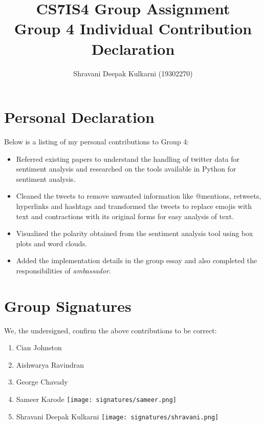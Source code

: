 \documentclass[a4paper,10pt]{article}
\begin{document}
\title{
    CS7IS4 Group Assignment \\
    \large Group 4 Individual Contribution Declaration
}
\author{
    Shravani Deepak Kulkarni (19302270)
}

\maketitle

\section{Personal Declaration}

Below is a listing of my personal contributions to Group 4:

\begin{itemize}
    \item{
    	Referred existing papers to understand the handling of twitter data for sentiment analysis and researched on the tools available in Python for sentiment analysis.
    }
    \item{
    	Cleaned the tweets to remove unwanted information like @mentions, retweets, hyperlinks and hashtags and transformed the tweets to replace emojis with text and contractions with its original forms for easy analysis of text.
	}
    \item{
    	Visualized the polarity obtained from the sentiment analysis tool using box plots and word clouds.
    }
    \item{
    	Added the implementation details in the group essay and also completed the responsibilities of \textit{ambassador}.
    }
    
\end{itemize}

\section{Group Signatures}

We, the undersigned, confirm the above contributions to be correct:

\begin{enumerate}
    \item{
        Cian Johnston 
    }
    \item{
        Aishwarya Ravindran
    }
    \item{
        George Chavady 
    }
    \item{
        Sameer Karode \texttt{[image: signatures/sameer.png]}
    }
    \item{
        Shravani Deepak Kulkarni \texttt{[image: signatures/shravani.png]}
    }

\end{enumerate}
\end{document}

